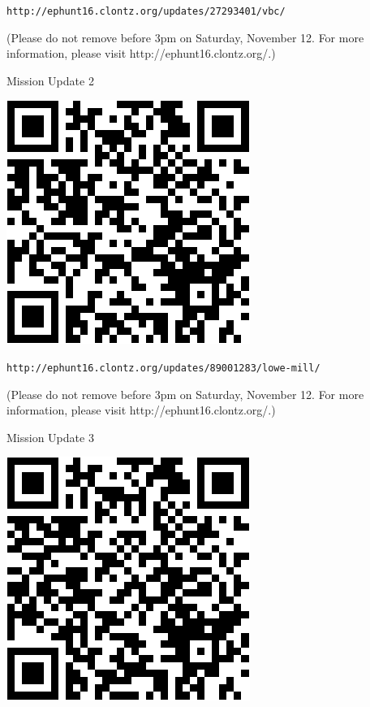 \documentclass{puzzlehunt}
\begin{document}
\verb|http://ephunt16.clontz.org/updates/27293401/vbc/|

\vfill

{\footnotesize (Please do not remove before 3pm on Saturday, November 12.
For more information, please visit http://ephunt16.clontz.org/.)}



Mission Update 2

\begin{center}
  \includegraphics[width=0.7\linewidth]{qr/lowe-mill.png}
\end{center}

\verb|http://ephunt16.clontz.org/updates/89001283/lowe-mill/|

\vfill

{\footnotesize (Please do not remove before 3pm on Saturday, November 12.
For more information, please visit http://ephunt16.clontz.org/.)}




Mission Update 3

\begin{center}
  \includegraphics[width=0.7\linewidth]{qr/brahan-spring.png}
\end{center}
\end{document}
